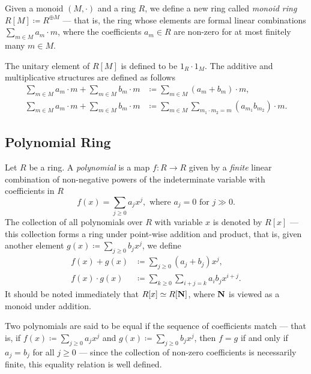 %
\begin{definition}
\label{def:monoid-ring}
Given a monoid \((M, \cdot)\) and a ring \(R\), we define a new ring called
\emph{monoid ring} \(R[M] \coloneq R^{\oplus M}\) --- that is, the ring whose
elements are formal linear combinations \(\sum_{m \in M} a_m \cdot m\), where
the coefficients \(a_m \in R\) are non-zero for at most finitely many
\(m \in M\).

The unitary element of \(R[M]\) is defined to be \(1_R \cdot 1_{M}\). The
additive and multiplicative structures are defined as follows
\begin{align*}
  \sum_{m \in M} a_m \cdot m + \sum_{m \in M} b_m \cdot m
  &\coloneq \sum_{m \in M} (a_m + b_m) \cdot m, \\
  \sum_{m \in M} a_m \cdot m + \sum_{m \in M} b_m \cdot m
  &\coloneq \sum_{m \in M} \sum_{m_1 \cdot m_2 = m} (a_{m_1} b_{m_2}) \cdot m.
\end{align*}
\end{definition}
%

\subsection{Polynomial Ring}

%
\begin{definition}[Polynomial]
\label{def:polynomial}
Let \(R\) be a ring. A \emph{polynomial} is a map \(f: R \to R\) given by a
\emph{finite} linear combination of non-negative powers of the indeterminate
variable with coefficients in \(R\)
\[
  f(x) = \sum_{j \geq 0} a_j x^j, \text{ where } a_j = 0 \text{ for } j \gg 0.
\]
The collection of all polynomials over \(R\) with variable \(x\) is denoted by
\(R[x]\) --- this collection forms a ring under point-wise addition and product,
that is, given another element \(g(x) \coloneq \sum_{j \geq 0} b_j x^j\), we
define
\begin{align*}
  f(x) + g(x) &\coloneq \sum_{j \geq 0} (a_j + b_j) x^j,\\
  f(x) \cdot g(x) &\coloneq \sum_{k \geq 0} \sum_{i + j = k} a_i b_j x^{i + j}.
\end{align*}
It should be noted immediately that \(R[x] \simeq R[\mathbf{N}]\), where \(\mathbf{N}\) is viewed
as a monoid under addition.
\end{definition}
%

Two polynomials are said to be equal if the sequence of coefficients match ---
that is, if \(f(x) \coloneq \sum_{j \geq 0} a_j x^j\) and
\(g(x) \coloneq \sum_{j \geq 0} b_j x^j\), then \(f = g\) if and only if
\(a_j = b_j\) for all \(j \geq 0\) --- since the collection of non-zero
coefficients is necessarily finite, this equality relation is well defined.

